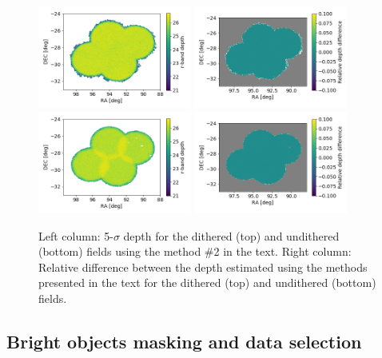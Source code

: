 \documentclass[twocolumn]{aastex62}
\begin{document}
\begin{figure}
\centering
\includegraphics[width=0.45\textwidth]{dithered_depth.png}
\includegraphics[width=0.45\textwidth]{dithered_difference.png}
\includegraphics[width=0.45\textwidth]{undithered_depth.png}
\includegraphics[width=0.45\textwidth]{undithered_difference.png}
\caption{Left column: 5-$\sigma$ depth for the dithered (top) and undithered (bottom) fields using the method \#2 in the text. Right column: Relative difference between the depth estimated using the methods presented in the text for the dithered (top) and undithered (bottom) fields.}
\label{fig:depth_maps}
\end{figure}

\subsection{Bright objects masking and data selection}
\end{document}
